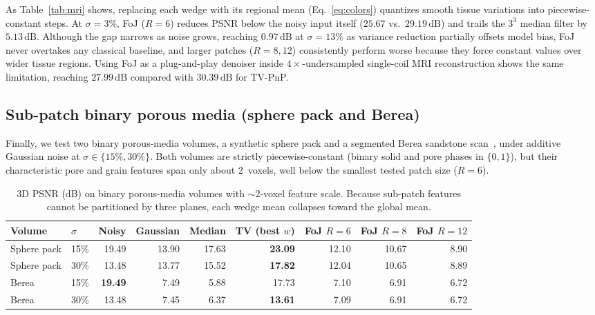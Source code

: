 \documentclass[11pt]{article}
\newcommand{\dB}{\,\mathrm{dB}}
\begin{document}
As Table~\ref{tab:mri} shows, replacing each wedge with its regional
mean (Eq.~\eqref{eq:colors}) quantizes smooth tissue variations into
piecewise-constant steps. At $\sigma{=}3\%$, FoJ ($R{=}6$) reduces PSNR
below the noisy input itself ($25.67$ vs.\ $29.19\dB$) and trails the
$3^3$ median filter by $5.13\dB$. Although the gap narrows as noise
grows, reaching $0.97\dB$ at $\sigma{=}13\%$ as variance reduction
partially offsets model bias, FoJ never overtakes any classical
baseline, and larger patches ($R{=}8,12$) consistently perform worse
because they force constant values over wider tissue regions. Using FoJ
as a plug-and-play denoiser inside $4\times$-undersampled single-coil
MRI reconstruction shows the same limitation, reaching $27.99\dB$
compared with $30.39\dB$ for TV-PnP.

\subsection{Sub-patch binary porous media (sphere pack and Berea)}

Finally, we test two binary porous-media volumes, a synthetic sphere
pack and a segmented Berea sandstone scan~\cite{neumann2020sandstones}, under
additive Gaussian noise at $\sigma\in\{15\%,30\%\}$. Both volumes are
strictly piecewise-constant (binary solid and pore phases in $\{0,1\}$),
but their characteristic pore and grain features span only about
2~voxels, well below the smallest tested patch size ($R{=}6$).

\begin{table}[!hb]
\centering\small
\begin{tabular}{llrrrrrrr}
\toprule
Volume & $\sigma$ & Noisy & Gaussian & Median & TV (best $w$) & FoJ $R{=}6$ & FoJ $R{=}8$ & FoJ $R{=}12$\\
\midrule
Sphere pack & 15\% & 19.49 & 13.90 & 17.63 & \textbf{23.09} & 12.10 & 10.67 & 8.90\\
Sphere pack & 30\% & 13.48 & 13.77 & 15.52 & \textbf{17.82} & 12.04 & 10.65 & 8.89\\
Berea       & 15\% & \textbf{19.49} & \phantom{0}7.49 & \phantom{0}5.88 & 17.73 & \phantom{0}7.10 & \phantom{0}6.91 & 6.72\\
Berea       & 30\% & 13.48 & \phantom{0}7.45 & \phantom{0}6.37 & \textbf{13.61} & \phantom{0}7.09 & \phantom{0}6.91 & 6.72\\
\bottomrule
\end{tabular}
\caption{3D PSNR (dB) on binary porous-media volumes with ${\sim}2$-voxel
feature scale. Because sub-patch features cannot be partitioned by three
planes, each wedge mean collapses toward the global mean.}
\label{tab:binary}
\end{table}
\end{document}
